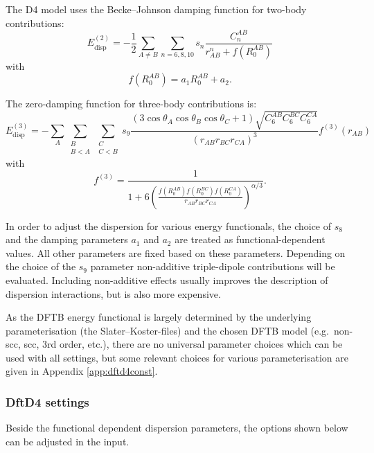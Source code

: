 The D4 model uses the Becke--Johnson damping function for two-body contributions:
\begin{equation*}
   E_{\text{disp}}^{(2)} = -\frac{1}{2} \sum_{A\neq B} \sum_{n=6,8,10} s_n
   \frac{C_n^{AB}}{r_{AB}^n + f(R_0^{AB})}
\end{equation*}
with
\begin{equation*}
   f(R_0^{AB}) = a_1 R_0^{AB} + a_2.
\end{equation*}

The zero-damping function for three-body contributions is:
\begin{equation*}
   E_{\text{disp}}^{(3)} = -\sum_{A}\sum_{\substack{B \\B < A}}\sum_{\substack{C\\ C < B}} s_9
   \frac{  \left(3\cos\theta_A\cos\theta_B\cos\theta_C+1\right)\sqrt{C_6^{AB}C_6^{BC}C_6^{CA}}}{(r_{AB}r_{BC}r_{CA})^3} f^{(3)}(r_{AB})
\end{equation*}
with
\begin{equation*}
   f^{(3)} = \frac{1}{1 + 6\left(\frac{f(R_0^{AB})f(R_0^{BC})f(R_0^{CA})}{r_{AB}r_{BC}r_{CA}}\right)^{\alpha/3}}.
\end{equation*}

In order to adjust the dispersion for various energy functionals, the choice of
$s_8$ and the damping parameters $a_1$ and $a_2$ are
treated as functional-dependent values. All other parameters are fixed based on
these parameters.
Depending on the choice of the $s_9$ parameter non-additive triple-dipole
contributions will be evaluated. Including non-additive effects usually improves
the description of dispersion interactions, but is also more expensive.

As the DFTB energy functional is largely determined by the underlying
parameterisation (the Slater--Koster-files) and the chosen DFTB model (e.g.\
non-scc, scc, 3rd order, etc.), there are no universal parameter choices which
can be used with all settings, but some relevant choices for various
parameterisation are given in Appendix \ref{app:dftd4const}.

\subsubsection{DftD4 settings}
Beside the functional dependent dispersion parameters, the options shown below
can be adjusted in the input.

